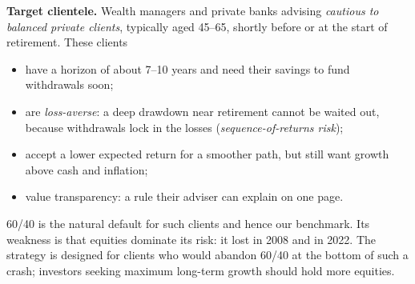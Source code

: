 \textbf{Target clientele.} Wealth managers and private banks advising \emph{cautious to balanced private clients}, typically
aged 45--65, shortly before or at the start of retirement. These clients
\begin{itemize}
\item have a horizon of about 7--10 years and need their savings to fund withdrawals soon;
\item are \emph{loss-averse}: a deep drawdown near retirement cannot be waited out, because withdrawals lock in the losses
(\emph{sequence-of-returns risk});
\item accept a lower expected return for a smoother path, but still want growth above cash and inflation;
\item value transparency: a rule their adviser can explain on one page.
\end{itemize}
60/40 is the natural default for such clients and hence our benchmark. Its weakness is that equities dominate its risk: it
lost  in 2008 and  in 2022. The strategy is designed for clients who would abandon
60/40 at the bottom of such a crash; investors seeking maximum long-term growth should hold more equities.
